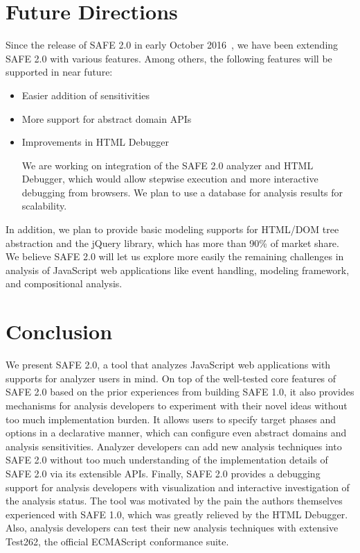 \documentclass[10pt, conference]{IEEEtran}
\newcommand{\oldsafe}{{SAFE 1.0}\xspace}
\newcommand{\safe}{{SAFE 2.0}\xspace}
\newcommand{\htmldebug}{{\sf\small HTML Debugger}\xspace}
\begin{document}
\section{Future Directions}
Since the release of \safe in early October 2016~\cite{saferelease},
we have been extending \safe with various features.
Among others, the following features will be supported in near future:
\begin{itemize}
\item Easier addition of sensitivities 
\item More support for abstract domain APIs
\item Improvements in \htmldebug

We are working on integration of the \safe analyzer and \htmldebug,
which would allow stepwise execution and more interactive debugging from browsers.
We plan to use a database for analysis results for scalability.
\end{itemize}
In addition, we plan to provide basic modeling supports for HTML/DOM
tree abstraction and the jQuery library, which has more than 90\% of
market share.  We believe \safe will let us explore more easily
the remaining challenges in analysis of JavaScript web applications
like event handling, modeling framework, and compositional analysis.


\section{Conclusion}
We present \safe, a tool that analyzes JavaScript web applications with
supports for analyzer users in mind.  On top of the well-tested core
features of \safe based on the prior experiences from building \oldsafe,
it also provides mechanisms for analysis developers to experiment with
their novel ideas without too much implementation burden.
It allows users to specify target phases and options in a declarative
manner, which can configure even abstract domains and analysis
sensitivities.  Analyzer developers can add new analysis techniques
into \safe without too much understanding of the implementation details
of \safe via its extensible APIs.  Finally, \safe provides a debugging
support for analysis developers with visualization and interactive
investigation of the analysis status.  The tool was motivated by the pain
the authors themselves experienced with \oldsafe, which was greatly
relieved by the \htmldebug.  Also, analysis developers can test their
new analysis techniques with extensive Test262, the official ECMAScript
conformance suite.



\end{document}
